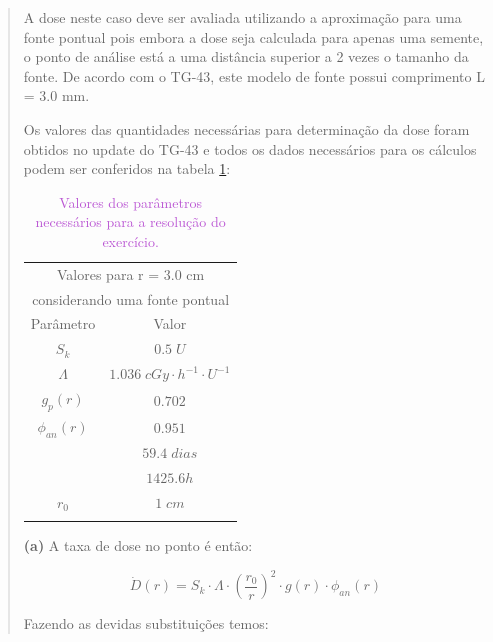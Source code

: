 \documentclass[11pt,a4paper]{article}
\begin{document}
			\begin{quote}
				\color{MediumOrchid}
				A dose neste caso deve ser avaliada utilizando a aproximação para uma fonte pontual pois embora a dose seja calculada para apenas uma semente, o ponto de análise está a uma distância superior a 2 vezes o tamanho da fonte. De acordo com o TG-43, este modelo de fonte possui comprimento L = 3.0 mm.

				Os valores das quantidades necessárias para determinação da dose foram obtidos no update do TG-43 e todos os dados necessários para os cálculos podem ser conferidos na tabela \ref{tb:paramExercCalcDose}:

				\begin{table}[h]
					\color{MediumOrchid}
					\centering
					\caption{\textcolor{MediumOrchid}{Valores dos parâmetros necessários para a resolução do exercício.}}
					\label{tb:paramExercCalcDose}
					\begin{tabular}{c c}
					\hline
					\multicolumn{2}{c}{Valores para r = 3.0 cm } \\
					\multicolumn{2}{c}{considerando uma fonte pontual} \\
					\midrule[1.5pt]
					Parâmetro & Valor \\
					\addlinespace[4pt]
					\midrule[1.5pt]
					$S_k$ & $0.5 \; U$ \\
					\addlinespace[4pt]
					\hline
					$\varLambda$ & $1.036 \; cGy  \cdot h^{-1} \cdot U^{-1}$ \\
					\addlinespace[4pt]
					\hline
					$g_p(r)$ & $0.702$ \\
					\addlinespace[4pt]
					\hline
					$\phi_{an}(r)$ & $0.951$ \\
					\addlinespace[4pt]
					\hline
					\multirow{2}{*}{$t_{1/2}$} & $59.4 \; dias$\\
					 & $1425.6 h$ \\
					\addlinespace[4pt]
					\hline
					 $r_0$ & $ 1 \; cm$ \\
					\addlinespace[4pt]
					\hline
					\hline
					
					\end{tabular}
				\end{table}

				\textbf{(a)} A taxa de dose  no ponto é então:

					$$\dot{D}(r) = S_k \cdot \varLambda \cdot \left(\frac{r_0}{r}\right)^2 \cdot g(r) \cdot \phi_{an}(r)$$
				
					Fazendo as devidas substituições temos:


\end{quote}
\end{document}
